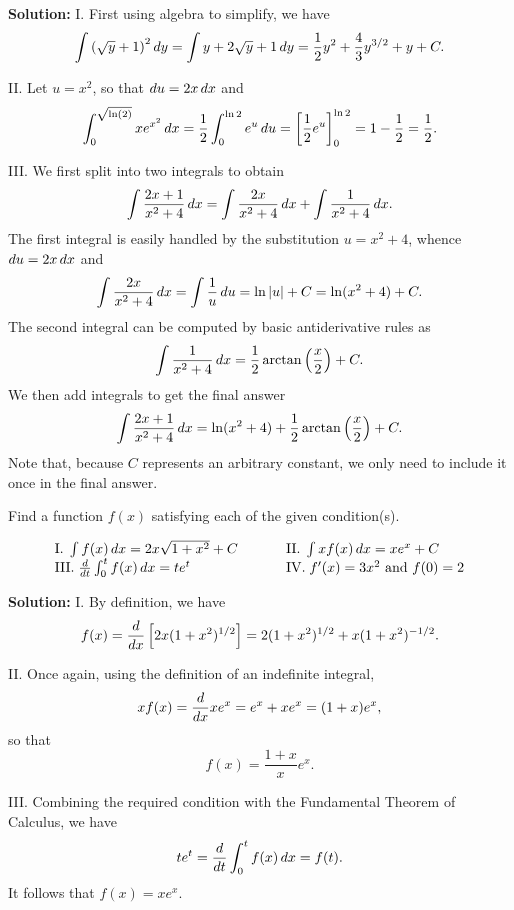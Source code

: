\documentclass[handout,hints]{ximera}
\begin{document}
\textbf{Solution:} I. First using algebra to simplify, we have
$$
\int \left(\sqrt{y}+1\right)^2 \mathop{}\!d y = \int y + 2 \sqrt{y} + 1 \mathop{}\!d y = \frac{1}{2}y^2 + \frac{4}{3} y^{3/2} + y + C.
$$

II. Let $u = x^2$, so that $\mathop{}\!d u = 2 x \mathop{}\!d x$ and 
$$
\int_0^{\sqrt{\ln(2)}} x e^{x^2} \mathop{}\!d x = \frac{1}{2} \int_0 ^{\ln 2} e^u \mathop{}\!d u = \bigg[ \frac{1}{2} e^u \bigg]_0^{\ln 2} = 1- \frac{1}{2} = \frac{1}{2}.
$$

III. We first split into two integrals to obtain 
$$
\int \frac{2x+1}{x^2+4} \mathop{}\!d x = \int \frac{2x}{x^2 + 4} \mathop{}\!d x + \int \frac{1}{x^2 + 4} \mathop{}\!d x.
$$
The first integral is easily handled by the substitution $u = x^2 + 4$, whence $\mathop{}\!d u = 2 x \mathop{}\!d x$ and 
$$
\int \frac{2x}{x^2 + 4} \mathop{}\!d x = \int \frac{1}{u} \mathop{}\!d u = \ln |u| + C = \ln (x^2 + 4) + C.
$$
The second integral can be computed by basic antiderivative rules as 
$$
\int \frac{1}{x^2 + 4} \mathop{}\!d x = \frac{1}{2} \arctan \left(\frac{x}{2}\right) + C.
$$
We then add integrals to get the final answer
$$
\int \frac{2x+1}{x^2+4} \mathop{}\!d x = \ln (x^2 + 4) + \frac{1}{2} \arctan \left(\frac{x}{2}\right) + C.
$$
Note that, because $C$ represents an arbitrary constant, we only need to include it once in the final answer.

\begin{problem}
Find a function $f(x)$ satisfying each of the given condition(s).

$$
\begin{array}{lll}
\mathrm{I.} \; \int f(x) \mathop{}\!d x = 2x \sqrt{1+ x^2} + C & \hspace{.2in} & \mathrm{II.} \; \int xf(x) \mathop{}\!d x = x e^x + C \\
\mathrm{III.} \; \frac{\mathop{}\!d}{\mathop{}\!d t} \int_0^t f(x) \mathop{}\!d x = t e^t & \hspace{.2in} & \mathrm{IV.} \; f'(x) = 3x^2 \mbox{ and } f(0)=2
\end{array}
$$
\end{problem}

\textbf{Solution:} I. By definition, we have
$$
f(x) = \frac{\mathop{}\!d}{\mathop{}\!d x}  \left[2x (1+ x^2)^{1/2}\right] = 2(1+x^2)^{1/2} + x  (1+x^2)^{-1/2}.
$$

II. Once again, using the definition of an indefinite integral, 
$$
x f(x) = \frac{\mathop{}\!d}{\mathop{}\!d x} x e^x = e^x + x e^x = (1+x)e^x,
$$
so that 
$$
f(x) = \frac{1+x}{x} e^x.
$$

III. Combining the required condition with the Fundamental Theorem of Calculus, we have
$$
te^t = \frac{\mathop{}\!d}{\mathop{}\!d t} \int_0^t f(x) \mathop{}\!d x = f(t).
$$
It follows that $f(x) = x e^x$.
\end{document}
